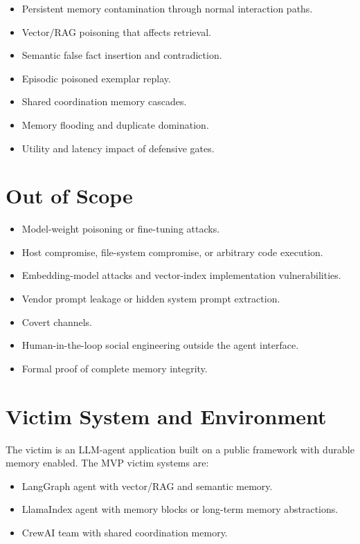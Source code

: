 \documentclass[11pt,oneside]{report}
\begin{document}
\begin{itemize}
  \item Persistent memory contamination through normal interaction paths.
  \item Vector/RAG poisoning that affects retrieval.
  \item Semantic false fact insertion and contradiction.
  \item Episodic poisoned exemplar replay.
  \item Shared coordination memory cascades.
  \item Memory flooding and duplicate domination.
  \item Utility and latency impact of defensive gates.
\end{itemize}

\section{Out of Scope}

\begin{itemize}
  \item Model-weight poisoning or fine-tuning attacks.
  \item Host compromise, file-system compromise, or arbitrary code execution.
  \item Embedding-model attacks and vector-index implementation vulnerabilities.
  \item Vendor prompt leakage or hidden system prompt extraction.
  \item Covert channels.
  \item Human-in-the-loop social engineering outside the agent interface.
  \item Formal proof of complete memory integrity.
\end{itemize}

\section{Victim System and Environment}

The victim is an LLM-agent application built on a public framework with durable memory enabled. The
MVP victim systems are:

\begin{itemize}
  \item LangGraph agent with vector/RAG and semantic memory.
  \item LlamaIndex agent with memory blocks or long-term memory abstractions.
  \item CrewAI team with shared coordination memory.
\end{itemize}
\end{document}
